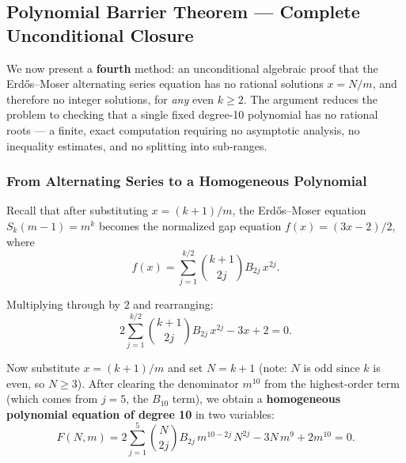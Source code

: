 \documentclass[12pt,a4paper]{article}
\theoremstyle{plain}
\theoremstyle{definition}
\begin{document}

\subsection{Polynomial Barrier Theorem --- Complete Unconditional Closure}
\label{sec:polynomial-barrier}


We now present a \textbf{fourth} method: an unconditional algebraic proof
that the Erd\H{o}s--Moser alternating series equation has no rational
solutions $x = N/m$, and therefore no integer solutions, for \emph{any}
even $k \ge 2$.  The argument reduces the problem to checking that a
single fixed degree-10 polynomial has no rational roots --- a
finite, exact computation requiring no asymptotic analysis, no inequality
estimates, and no splitting into sub-ranges.

\subsubsection{From Alternating Series to a Homogeneous Polynomial}
\label{sec:homogeneous-derivation}

Recall that after substituting $x = (k+1)/m$, the Erd\H{o}s--Moser
equation $S_k(m-1) = m^k$ becomes the normalized gap equation
$f(x) = (3x-2)/2$, where
\[
  f(x) = \sum_{j=1}^{k/2} \binom{k+1}{2j} B_{2j} \, x^{2j}.
\]

Multiplying through by $2$ and rearranging:
\[
  2\sum_{j=1}^{k/2} \binom{k+1}{2j} B_{2j} \, x^{2j} - 3x + 2 = 0.
\]

Now substitute $x = (k+1)/m$ and set $N = k+1$ (note: $N$ is odd
since $k$ is even, so $N \ge 3$).  After clearing the denominator
$m^{10}$ from the highest-order term (which comes from $j=5$, the
$B_{10}$ term), we obtain a \textbf{homogeneous polynomial equation
of degree 10} in two variables:
\begin{equation}\label{eq:homogeneous}
  F(N, m) = 2\sum_{j=1}^{5} \binom{N}{2j} B_{2j} \, m^{10-2j} \, N^{2j}
            - 3N \, m^{9} + 2m^{10} = 0.
\end{equation}
\end{document}
